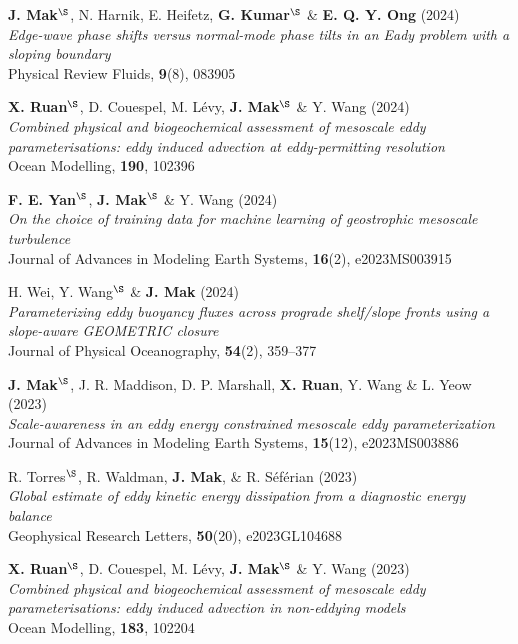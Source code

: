 \documentclass[letterpaper]{article}
\renewenvironment{itemize}{
  \begin{list}{}{
    \setlength{\leftmargin}{1.5em}
  }
}{
  \end{list}
}
\begin{document}
\begin{itemize}
\item[23.] \textbf{J. Mak}$^{\S}$, N. Harnik, E. Heifetz, \textbf{G. Kumar}$^{\S}$ \& \textbf{E. Q. Y. Ong} (2024)\\
\textit{Edge-wave phase shifts versus normal-mode phase tilts in an Eady problem with a sloping boundary}\\
Physical Review Fluids, \textbf{9}(8), 083905

\item[22.] \textbf{X. Ruan}$^{\S}$, D. Couespel, M. L\'evy, \textbf{J. Mak}$^{\S}$ \& Y. Wang (2024)\\
\textit{Combined physical and biogeochemical assessment of mesoscale eddy parameterisations: eddy induced advection at eddy-permitting resolution}\\
Ocean Modelling, \textbf{190}, 102396

\item[21.] \textbf{F. E. Yan}$^{\S}$, \textbf{J. Mak}$^{\S}$ \& Y. Wang (2024)\\
\textit{On the choice of training data for machine learning of geostrophic mesoscale turbulence}\\
Journal of Advances in Modeling Earth Systems, \textbf{16}(2), e2023MS003915

\item[20.] H. Wei, Y. Wang$^{\S}$ \& \textbf{J. Mak} (2024)\\
\textit{Parameterizing eddy buoyancy fluxes across prograde shelf/slope fronts using a slope-aware GEOMETRIC closure}\\
Journal of Physical Oceanography, \textbf{54}(2), 359--377

\item[19.] \textbf{J. Mak}$^{\S}$, J. R. Maddison, D. P. Marshall, \textbf{X. Ruan}, Y. Wang \& L. Yeow (2023)\\
\textit{Scale-awareness in an eddy energy constrained mesoscale eddy parameterization}\\
Journal of Advances in Modeling Earth Systems, \textbf{15}(12), e2023MS003886

\item[18.] R. Torres$^{\S}$, R. Waldman, \textbf{J. Mak}, \& R. S\'ef\'erian (2023)\\
\textit{Global estimate of eddy kinetic energy dissipation from a diagnostic energy balance}\\
Geophysical Research Letters, \textbf{50}(20), e2023GL104688

\item[17.] \textbf{X. Ruan}$^{\S}$, D. Couespel, M. L\'evy, \textbf{J. Mak}$^{\S}$ \& Y. Wang (2023)\\
\textit{Combined physical and biogeochemical assessment of mesoscale eddy parameterisations: eddy induced advection in non-eddying models}\\
Ocean Modelling, \textbf{183}, 102204


\end{itemize}
\end{document}
